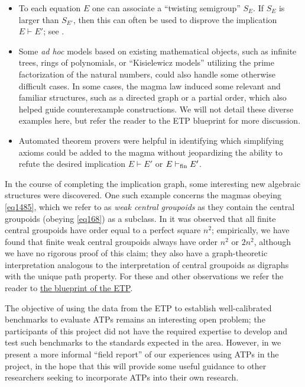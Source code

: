 \begin{itemize}
        \item To each equation $E$ one can associate a ``twisting semigroup'' $S_E$.  If $S_E$ is larger than $S_{E'}$, then this can often be used to disprove the implication $E \vdash E'$; see .
        \item Some \emph{ad hoc} models based on existing mathematical objects, such as infinite trees, rings of polynomials, or ``Kisielewicz models'' utilizing the prime factorization of the natural numbers, could also handle some otherwise difficult cases.  In some cases, the magma law induced some relevant and familiar structures, such as a directed graph or a partial order, which also helped guide counterexample constructions. We will not detail these diverse examples here, but refer the reader to the ETP blueprint for more discussion.
        \item Automated theorem provers were helpful in identifying which simplifying axioms could be added to the magma without jeopardizing the ability to refute the desired implication $E \vdash E'$ or $E \vdash_{\mathrm{fin}} E'$.
\end{itemize}

In the course of completing the implication graph, some interesting new algebraic structures were discovered.  One such example concerns the magmas obeying \eqref{eq1485}, which we refer to as \emph{weak central groupoids} as they contain the central groupoids (obeying \eqref{eq168}) as a subclass.  In \cite{knuth} it was observed that all finite central groupoids have order equal to a perfect square $n^2$; empirically, we have found that finite weak central groupoids always have order $n^2$ or $2n^2$, although we have no rigorous proof of this claim; they also have a graph-theoretic interpretation analogous to the interpretation of central groupoids as digraphs with the unique path property.  For these and other observations we refer the reader to \href{https://teorth.github.io/equational_theories/blueprint/weak-central-groupoids-chapter.html}{the blueprint of the ETP}.

The objective of using the data from the ETP to establish well-calibrated benchmarks to evaluate ATPs remains an interesting open problem; the participants of this project did not have the required expertise to develop and test such benchmarks to the standards expected in the area.  However, in  we present a more informal ``field report'' of our experiences using ATPs in the project, in the hope that this will provide some useful guidance to other researchers seeking to incorporate ATPs into their own research.


